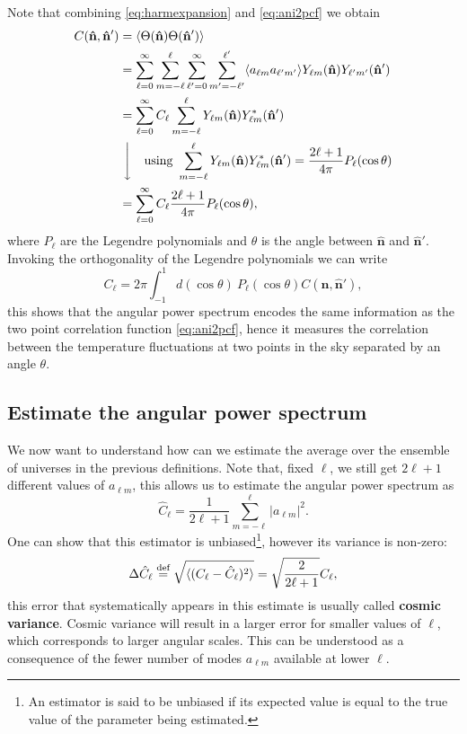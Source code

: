 Note that combining \eqref{eq:harmexpansion} and \eqref{eq:ani2pcf} we obtain
\begin{align*}
    C(\mathbf{\hat{n}},\mathbf{\hat{n}}') &= \langle \Theta(\mathbf{\hat{n}})\Theta(\mathbf{\hat{n}}') \rangle \\ &= \sum_{\ell=0}^{\infty} \sum_{m=-\ell}^{\ell}  \sum_{\ell'=0}^{\infty} \sum_{m'=-\ell'}^{\ell'} \langle a_{\ell m} a_{\ell' m'} \rangle Y_{\ell m}(\mathbf{\hat{n}})Y_{\ell' m'}(\mathbf{\hat{n}}')\\
    &= \sum_{\ell=0}^{\infty}C_{\ell} \sum_{m=-\ell}^{\ell}  Y_{\ell m}(\mathbf{\hat{n}})Y^*_{\ell m}(\mathbf{\hat{n}}')\\
    &\ \Bigg\downarrow\quad \text{using } \sum_{m=-\ell}^{\ell}Y_{\ell m}(\mathbf{\hat{n}})Y^*_{\ell m}(\mathbf{\hat{n}}')=\frac{2\ell+1}{4\pi}P_{\ell}(\cos\theta)\\
    &=\sum_{\ell=0}^{\infty} C_{\ell}\frac{2\ell+1}{4\pi}P_{\ell}(\cos\theta),
    \end{align*}
where $P_{\ell}$ are the Legendre polynomials and $\theta$ is the angle between $\mathbf{\hat{n}}$ and $\mathbf{\hat{n}}'$.
Invoking the orthogonality of the Legendre polynomials we can write
\begin{equation}\label{eq:cl}
    C_{\ell} = 2\pi\int_{-1}^{1}d(\cos\theta)\ P_{\ell}(\cos\theta)C(\mathbf{\hat{n}},\mathbf{\hat{n}}'),
\end{equation}
this shows that the angular power spectrum encodes the same information as the two point correlation function \eqref{eq:ani2pcf}, hence it measures the correlation between the temperature fluctuations at two points in the sky separated by an angle $\theta$.

\subsection{Estimate the angular power spectrum}\label{sec:EstimateCl}
We now want to understand how can we estimate the average over the ensemble of universes in the previous definitions. Note that, fixed $\ell$, we still get $2\ell+1$ different values of $a_{\ell  m}$, this allows us to estimate the angular power spectrum as
\begin{equation}\label{eq:cl_estimate}
    \hat{C}_{\ell} = \frac{1}{2\ell+1}\sum_{m=-\ell}^{\ell} |a_{\ell m}|^2.
\end{equation}
One can show that this estimator is unbiased\footnote{An estimator is said to be unbiased if its expected value is equal to the true value of the parameter being estimated.}, however its variance is non-zero:
\begin{equation}\label{eq:cl_variance}
    \Delta\hat{C}_{\ell} \stackrel{\text{def}}{=}\sqrt{\langle(C_\ell -\hat C_\ell)^2\rangle} = \sqrt{\frac{2}{2\ell+1}}C_{\ell},
\end{equation} 
this error that systematically appears in this estimate is usually called \textbf{cosmic variance}. Cosmic variance will result in a larger error for smaller values of $\ell$, which corresponds to larger angular scales. This can be understood as a consequence of the fewer number of modes $a_{\ell m}$ available at lower $\ell$.

